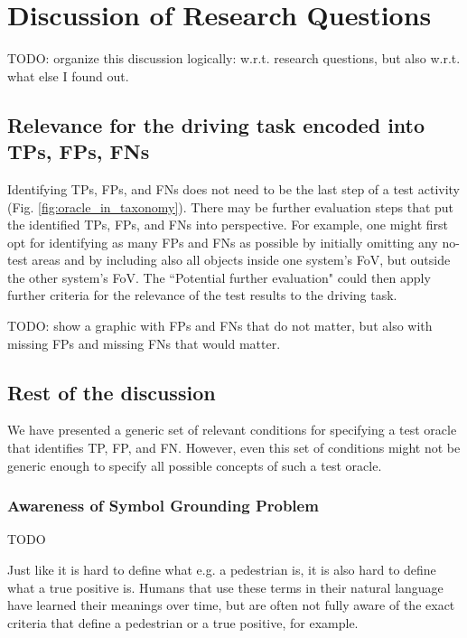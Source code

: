 \documentclass[conference]{IEEEtran}
\begin{document}
\section{Discussion of Research Questions}
\label{sec:discussion}

TODO: organize this discussion logically: w.r.t. research questions, but also w.r.t. what else I found out. 

\subsection{Relevance for the driving task encoded into TPs, FPs, FNs}

Identifying TPs, FPs, and FNs does not need to be the last step of a test activity (Fig. \ref{fig:oracle_in_taxonomy}). 
There may be further evaluation steps that put the identified TPs, FPs, and FNs into perspective. 
For example, one might first opt for identifying as many FPs and FNs as possible by initially omitting any no-test areas and by including also all objects inside one system's FoV, but outside the other system's FoV. 
The ``Potential further evaluation" could then apply further criteria for the relevance of the test results to the driving task. 


TODO: show a graphic with FPs and FNs that do not matter, but also with missing FPs and missing FNs that would matter. 



\subsection{Rest of the discussion}

We have presented a generic set of relevant conditions for specifying a test oracle that identifies TP, FP, and FN. 
However, even this set of conditions might not be generic enough to specify all possible concepts of such a test oracle. 


\subsubsection{Awareness of Symbol Grounding Problem}

TODO

Just like it is hard to define what e.g. a pedestrian is, it is also hard to define what a true positive is. 
Humans that use these terms in their natural language have learned their meanings over time, but are often not fully aware of the exact criteria that define a pedestrian or a true positive, for example.  
\end{document}
